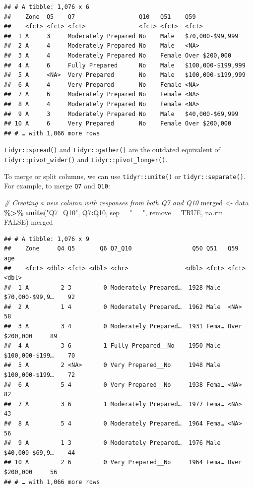 \documentclass[
]{book}
\newenvironment{Shaded}{\begin{snugshade}}{\end{snugshade}}
\newcommand{\CommentTok}[1]{\textcolor[rgb]{0.56,0.35,0.01}{\textit{#1}}}
\newcommand{\DataTypeTok}[1]{\textcolor[rgb]{0.13,0.29,0.53}{#1}}
\newcommand{\KeywordTok}[1]{\textcolor[rgb]{0.13,0.29,0.53}{\textbf{#1}}}
\newcommand{\NormalTok}[1]{#1}
\newcommand{\OperatorTok}[1]{\textcolor[rgb]{0.81,0.36,0.00}{\textbf{#1}}}
\newcommand{\OtherTok}[1]{\textcolor[rgb]{0.56,0.35,0.01}{#1}}
\newcommand{\StringTok}[1]{\textcolor[rgb]{0.31,0.60,0.02}{#1}}
\begin{document}
\begin{verbatim}
## # A tibble: 1,076 x 6
##    Zone  Q5    Q7                  Q10   Q51    Q59              
##    <fct> <fct> <fct>               <fct> <fct>  <fct>            
##  1 A     3     Moderately Prepared No    Male   $70,000-$99,999  
##  2 A     4     Moderately Prepared No    Male   <NA>             
##  3 A     4     Moderately Prepared No    Female Over $200,000    
##  4 A     6     Fully Prepared      No    Male   $100,000-$199,999
##  5 A     <NA>  Very Prepared       No    Male   $100,000-$199,999
##  6 A     4     Very Prepared       No    Female <NA>             
##  7 A     6     Moderately Prepared No    Female <NA>             
##  8 A     4     Moderately Prepared No    Female <NA>             
##  9 A     3     Moderately Prepared No    Male   $40,000-$69,999  
## 10 A     6     Very Prepared       No    Female Over $200,000    
## # … with 1,066 more rows
\end{verbatim}

\texttt{tidyr::spread()} and \texttt{tidyr::gather()} are the outdated equivalent of \texttt{tidyr::pivot\_wider()} and \texttt{tidyr::pivot\_longer()}.

To merge or split columns, we can use \texttt{tidyr::unite()} or \texttt{tidyr::separate()}. For example, to merge \texttt{Q7} and \texttt{Q10}:

\begin{Shaded}
\begin{Highlighting}[]
\CommentTok{\# Creating a new column with responses from both Q7 and Q10}
\NormalTok{merged \textless{}{-}}\StringTok{ }\NormalTok{data }\OperatorTok{\%\textgreater{}\%}\StringTok{ }\KeywordTok{unite}\NormalTok{(}\StringTok{"Q7\_Q10"}\NormalTok{, Q7}\OperatorTok{:}\NormalTok{Q10, }\DataTypeTok{sep =} \StringTok{"\_\_"}\NormalTok{, }\DataTypeTok{remove =} \OtherTok{TRUE}\NormalTok{, }\DataTypeTok{na.rm =} \OtherTok{FALSE}\NormalTok{)}
\NormalTok{merged}
\end{Highlighting}
\end{Shaded}

\begin{verbatim}
## # A tibble: 1,076 x 9
##    Zone     Q4 Q5       Q6 Q7_Q10                 Q50 Q51   Q59              age
##    <fct> <dbl> <fct> <dbl> <chr>                <dbl> <fct> <fct>          <dbl>
##  1 A         2 3         0 Moderately Prepared…  1928 Male  $70,000-$99,9…    92
##  2 A         1 4         0 Moderately Prepared…  1962 Male  <NA>              58
##  3 A         3 4         0 Moderately Prepared…  1931 Fema… Over $200,000     89
##  4 A         3 6         1 Fully Prepared__No    1950 Male  $100,000-$199…    70
##  5 A         2 <NA>      0 Very Prepared__No     1948 Male  $100,000-$199…    72
##  6 A         5 4         0 Very Prepared__No     1938 Fema… <NA>              82
##  7 A         3 6         1 Moderately Prepared…  1977 Fema… <NA>              43
##  8 A         5 4         0 Moderately Prepared…  1964 Fema… <NA>              56
##  9 A         1 3         0 Moderately Prepared…  1976 Male  $40,000-$69,9…    44
## 10 A         2 6         0 Very Prepared__No     1964 Fema… Over $200,000     56
## # … with 1,066 more rows
\end{verbatim}
\end{document}
